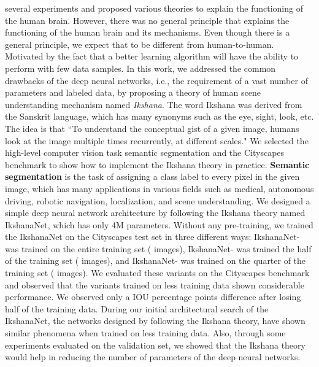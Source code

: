 \documentclass{article}
\begin{document}
several experiments and proposed various theories to explain the functioning of the human brain. However, there was no general principle that explains the functioning of the human brain and its mechanisms. Even though there is a general principle, we expect that to be different from human-to-human. \newline
Motivated by the fact that a better learning algorithm will have the ability to perform with few data samples. In this work, we addressed the common drawbacks of the deep neural networks, i.e., the requirement of a vast number of parameters and labeled data, by proposing a theory of human scene understanding mechanism named \textit{Ikshana}. The word Ikshana was derived from the Sanskrit language, which has many synonyms such as the eye, sight, look, etc. The idea is that ``To understand the conceptual gist of a given image, humans look at the image multiple times recurrently, at different scales."
We selected the high-level computer vision task semantic segmentation and the Cityscapes benchmark to show how to implement the Ikshana theory in practice.\newline
\textbf{Semantic segmentation} is the task of assigning a class label to every pixel in the given image, which has many applications in various fields such as medical, autonomous driving, robotic navigation, localization, and scene understanding. We designed a simple deep neural network architecture by following the Ikshana theory named IkshanaNet, which has only 4M parameters. Without any pre-training, we trained the IkshanaNet on the Cityscapes test set in three different ways: IkshanaNet- was trained on the entire training set ( images), IkshanaNet- was trained the half of the training set ( images), and IkshanaNet- was trained on the quarter of the training set ( images). We evaluated these variants on the Cityscapes benchmark and observed that the variants trained on less training data shown considerable performance. We observed only a  IOU percentage points difference after losing half of the training data. During our initial architectural search of the IkshanaNet, the networks designed by following the Ikshana theory, have shown similar phenomena when trained on less training data.
Also, through some experiments evaluated on the validation set, we showed that the Ikshana theory would help in reducing the number of parameters of the deep neural networks.\newline 
\end{document}
